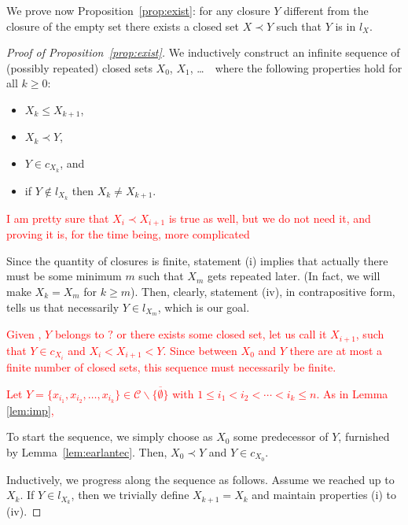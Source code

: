 \documentclass{article}
\newcommand{\deleted}[1]{\textcolor{red}{#1}}
\def\C{\mathcal{C}}
\newcommand{\cl}[1]{\overline{#1}}
\def\bef{\prec}
\begin{document}
We prove now Proposition~\ref{prop:exist}:
for any closure $Y$ different from the 
closure of the empty set there exists 
a closed set $X \bef Y$ such that $Y$ is in $l_X$.

\begin{proof}[Proof of Proposition~\ref{prop:exist}] 
We inductively construct an infinite sequence of 
(possibly repeated) closed sets $X_0$, $X_1$, \dots\ \ where
the following properties hold for all $k \geq 0$:

\begin{itemize}
\item[(i)] 
$X_k \leq X_{k+1}$, 
\item[(ii)] 
$X_k \bef Y$,
\item[(iii)] 
$Y \in c_{X_k}$, and
\item[(iv)] 
if $Y \notin l_{X_k}$ then $X_k \neq X_{k+1}$.
\end{itemize}

\deleted{I am pretty sure that $X_i \bef X_{i+1}$ is true as well,
but we do not need it, and proving it is, for the time being,
more complicated}

Since the quantity of closures is finite, statement (i)
implies that actually there must be some minimum $m$ 
such that $X_m$ gets repeated later. (In fact, we will make $X_k = X_m$
for $k\geq m$). Then, clearly, statement (iv), in contrapositive
form, tells us that necessarily $Y \in l_{X_m}$, which is our goal.

\deleted{Given , $Y$ belongs to $ ? $ or there exists some closed set, let us call it $X_{i+1}$, such that $Y \in c_{X_i}$ and  $X_i<X_{i+1}<Y$. Since between $X_0$ and $Y$ there are at most a finite number of closed sets, this sequence must necessarily be finite.}

\deleted{Let $Y =\{x_{i_1},x_{i_2}, \ldots, x_{i_k}\} 
\in \C \backslash \{\cl{\emptyset}\}$ 
with $1\leq i_1 < i_2 < \cdots < i_k \leq n$. 
As in Lemma \ref{lem:imp}, }

To start the sequence, we simply choose as $X_0$ some predecessor of $Y$, furnished by Lemma~\ref{lem:earlantec}.
Then, $X_0 \bef Y$ and $Y \in c_{X_0}$. 

Inductively, we progress along the sequence as follows.
Assume we reached up to $X_k$.
If $Y \in l_{X_k}$, then we trivially define $X_{k+1}=X_k$
and maintain properties (i) to (iv).


\end{proof}
\end{document}
